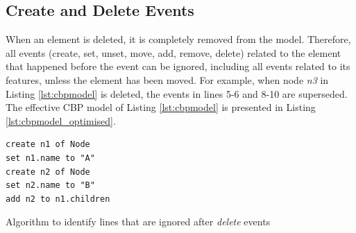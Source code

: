 \documentclass[12pt, a4paper]{report} \usepackage[titletoc]{appendix}
\begin{document}
\subsection{Create and Delete Events}
\label{subsec:create_and_delete_operations}
When an element is deleted, it is completely removed from the model. Therefore, all events (create, set, unset, move, add, remove, delete) related to the element that happened before the event can be ignored, including all events related to its features, unless the element has been moved. For example, when node \emph{n3} in Listing \ref{lst:cbpmodel}  is deleted, the events in lines 5-6 and 8-10 are superseded. The effective CBP model of Listing \ref{lst:cbpmodel} is presented in Listing \ref{lst:cbpmodel_optimised}.

\begin{lstlisting}[style=eol,caption={Change-based representation of the model of Fig. \ref{fig:initial_model} after removal of node \emph{n5}.},label=lst:cbpmodel_optimised]
create n1 of Node
set n1.name to "A"
create n2 of Node
set n2.name to "B"
add n2 to n1.children
\end{lstlisting}

\begin{algorithm}[H]
    \begin{small}
    \end{small}
    \caption{Algorithm to identify lines that are ignored after \emph{delete} events}
    \label{alg:create_delete_optimisation}
\end{algorithm}
\end{document}
